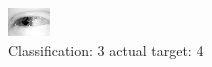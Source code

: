 \begin{figure}[h!]
\begin{center}
\includegraphics[width=0.60\columnwidth]{figures/ID2459_class_3_target_4.png}
\end{center}
\caption{ Classification: 3 actual target: 4}
\label{fig:ID2459_class_3_target_4}
\end{figure}
